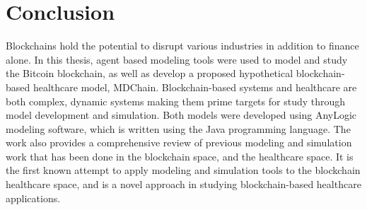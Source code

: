 \documentclass[12pt]{report}
\begin{document}















\chapter{Conclusion}
Blockchains hold the potential to disrupt various industries in addition to finance alone. In this thesis, agent based modeling tools were used to model and study the Bitcoin blockchain, as well as develop a proposed hypothetical blockchain-based healthcare model, MDChain. Blockchain-based systems and healthcare are both complex, dynamic systems making them prime targets for study through model development and simulation. Both models were developed using AnyLogic modeling software, which is written using the Java programming language. The work also provides a comprehensive review of previous modeling and simulation work that has been done in the blockchain space, and the healthcare space. It is the first known attempt to apply modeling and simulation tools to the blockchain healthcare space, and is a novel approach in studying blockchain-based healthcare applications.
\end{document}
